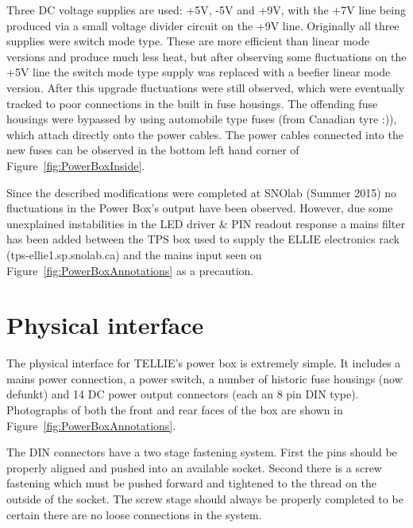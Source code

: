 \documentclass[12pt]{report}
\begin{document}
Three DC voltage supplies are used: +5V, -5V and +9V, with the +7V line being produced via a small voltage divider circuit on the +9V line. Originally all three supplies were switch mode type. These are more efficient than linear mode versions and produce much less heat, but after observing some fluctuations on the +5V line the switch mode type supply was replaced with a beefier linear mode version. After this upgrade fluctuations were still observed, which were eventually tracked to poor connections in the built in fuse housings. The offending fuse housings were bypassed by using automobile type fuses (from Canadian tyre :)), which attach directly onto the power cables. The power cables connected into the new fuses can be observed in the bottom left hand corner of Figure~\ref{fig:PowerBoxInside}. 

Since the described modifications were completed at SNOlab (Summer 2015) no fluctuations in the Power Box's output have been observed. However, due some unexplained instabilities in the LED driver \& PIN readout response a mains filter has been added between the TPS box used to supply the ELLIE electronics rack (tps-ellie1.sp.snolab.ca) and the mains input seen on Figure~\ref{fig:PowerBoxAnnotations} as a precaution. 


\section{Physical interface}

The physical interface for TELLIE's power box is extremely simple. It includes a mains power connection, a power switch, a number of historic fuse housings (now defunkt) and 14 DC power output connectors (each an 8 pin DIN type). Photographs of both the front and rear faces of the box are shown in Figure~\ref{fig:PowerBoxAnnotations}.

The DIN connectors have a two stage fastening system. First the pins should be properly aligned and pushed into an available socket. Second there is a screw fastening which must be pushed forward and tightened to the thread on the outside of the socket. The screw stage should always be properly completed to be certain there are no loose connections in the system.   
\end{document}
